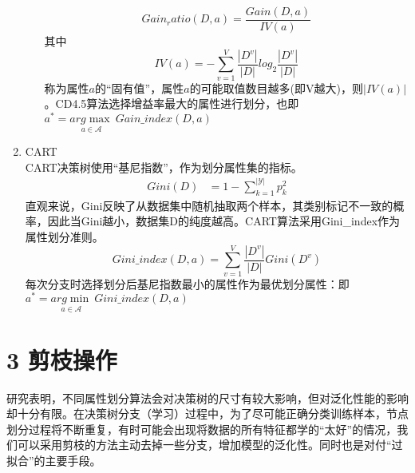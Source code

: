 \documentclass[twoside]{article}
\begin{document}
\begin{enumerate}
\begin{enumerate}
        \begin{equation*}
            Gain_ratio(D,a)=\frac{Gain(D,a)}{IV(a)}
        \end{equation*}
        其中
        \begin{equation*}
            IV(a)=-\sum_{v=1}^V\frac{|D^v|}{|D|} log_2 \frac{|D^v|}{|D|}
        \end{equation*}
        称为属性$a$的“固有值”，属性$a$的可能取值数目越多(即V越大)，则$|IV(a)|$。CD4.5算法选择增益率最大的属性进行划分，也即$a^*=\underset{a\in\mathcal{A}}{arg\max}~Gain\_index(D,a)$
    \end{enumerate}
    \item  CART\\
    CART决策树使用“基尼指数”，作为划分属性集的指标。
    \begin{equation*}
        \begin{aligned}
        Gini(D)
            &=1-\sum_{k=1}^{|\mathcal{Y}|}p_k^2
        \end{aligned}
    \end{equation*}
    直观来说，Gini反映了从数据集中随机抽取两个样本，其类别标记不一致的概率，因此当Gini越小，数据集D的纯度越高。CART算法采用Gini\_index作为属性划分准则。
    \begin{equation*}
        Gini\_index(D,a)=\sum_{v=1}^V\frac{|D^v|}{|D|}Gini(D^v)
        \end{equation*}
        每次分支时选择划分后基尼指数最小的属性作为最优划分属性：即$a^*=\underset{a\in\mathcal{A}}{arg\min}~Gini\_index(D,a)$
\end{enumerate}
\section*{3 剪枝操作}
研究表明，不同属性划分算法会对决策树的尺寸有较大影响，但对泛化性能的影响却十分有限。在决策树分支（学习）过程中，为了尽可能正确分类训练样本，节点划分过程将不断重复，有时可能会出现将数据的所有特征都学的“太好”的情况，我们可以采用剪枝的方法主动去掉一些分支，增加模型的泛化性。同时也是对付“过拟合”的主要手段。
\end{document}
